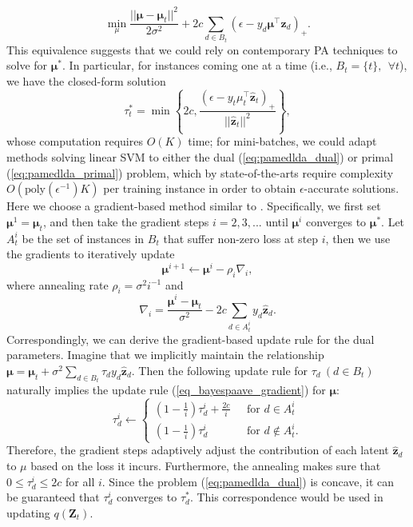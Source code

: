 \documentclass[twoside,11pt]{article}
\newcommand{\zv}{\bm{z}}
\newcommand{\Zv}{\bm{Z}}
\newcommand{\muv}{\bm \mu}
\begin{document}
\begin{enumerate}
\begin{equation}
\min_{\mu}{\frac{||\muv-\muv_t||^2}{2 \sigma^2}+2c \sum\limits_{d \in B_t}{\left( \epsilon-y_d \muv^\top \widehat{\zv}_d \right)_{+}}}.
\end{equation}
This equivalence suggests that we could rely on contemporary PA techniques to solve for $\muv^*$. In particular, for instances coming one at a time (i.e., $B_t = \{t\}, ~~\forall t$), we have the closed-form solution $$\tau_t^* = \min\left\{2c, \frac{\left( \epsilon-y_t \mu_t^\top \widehat{\zv}_t \right)_+}{||\widehat{\zv}_t||^2}\right\},$$
whose computation requires $O(K)$ time; for mini-batches, we could adapt methods solving linear SVM to either the dual (\ref{eq:pamedlda_dual}) or primal (\ref{eq:pamedlda_primal}) problem, which by state-of-the-arts require complexity $O(\text{poly}(\epsilon^{-1}) K)$ per training instance in order to obtain $\epsilon$-accurate solutions. Here we choose a gradient-based method similar to \citet{shalev2011pegasos}. Specifically, we first set $\muv^1 = \muv_t$, and then take the gradient steps $i = 2, 3, ...$ until $\muv^i$ converges to $\muv^*$. Let $A_t^i$ be the set of instances in $B_t$ that suffer non-zero loss at step $i$, then we use the gradients to iteratively update
\begin{equation} \label{eq_bayespaave_gradient}
\muv^{i+1} \leftarrow \muv^i-\rho_i \nabla_i,
\end{equation}
where  annealing rate $\rho_i = \sigma^2  i^{-1}$ and
\begin{equation*}
\nabla_i = \frac{\muv^i-\muv_t}{\sigma^2}-2c \sum\limits_{d \in A_t^i}{y_d \widehat{\zv}_d}.
\end{equation*}
Correspondingly, we can derive the gradient-based update rule for the dual parameters. Imagine that we implicitly maintain the relationship $\muv = \muv_t+\sigma^2 \sum_{d \in B_t}{\tau_d y_d \widehat{\zv}_d}$. Then the following update rule for $\tau_d~ (d \in B_t)$ naturally implies the update rule (\ref{eq_bayespaave_gradient}) for $\muv$:
\begin{equation*}
\tau_d^i \leftarrow \left\{
\begin{array}{ll}
(1-\frac{1}{i}) \tau_d^i+ \frac{2c}{i} & ~~~ \text{for } d \in A_t^i \\
(1-\frac{1}{i})\tau_d^i & ~~~ \text{for } d \not\in A_t^i.
\end{array}
\right.
\end{equation*}
Therefore, the gradient steps adaptively adjust the contribution of each latent $\widehat{\zv}_d$ to $\mu$ based on the loss it incurs. Furthermore, the annealing makes sure that $0 \leq \tau_d^i \leq 2c$ for all $i$. Since the problem (\ref{eq:pamedlda_dual}) is concave, it can be guaranteed that $\tau_d^i$ converges to $\tau_d^*$. This correspondence would be used in updating $q(\Zv_t)$.


\end{enumerate}
\end{document}
